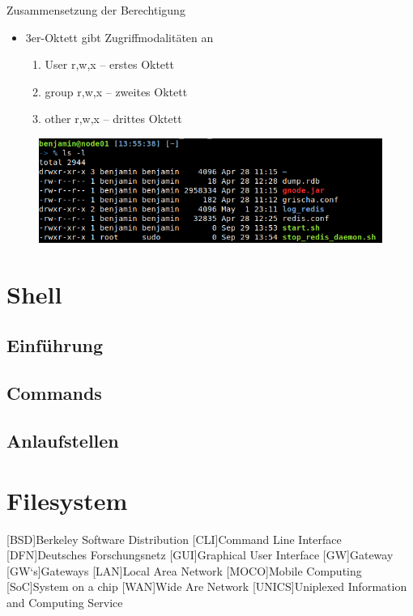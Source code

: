 \documentclass[xcolor=dvipsnames,aspectratio=169]{beamer}
\begin{document}
\begin{frame}
Zusammensetzung der Berechtigung
\begin{itemize}
	\item 3er-Oktett gibt Zugriffmodalitäten an
	\begin{enumerate}
		\item User r,w,x -- erstes Oktett
		\item group r,w,x -- zweites Oktett
		\item other r,w,x -- drittes Oktett
	\end{enumerate}
\end{itemize}
\begin{figure}
	\includegraphics[scale=0.5]{rights}
\end{figure}
\end{frame}

\section{Shell}

\subsection{Einführung}

\subsection{Commands}

\subsection{Anlaufstellen}

\section{Filesystem}

\begin{acronym}
[BSD]{Berkeley Software Distribution}
[CLI]{Command Line Interface}
[DFN]{Deutsches Forschungsnetz}
[GUI]{Graphical User Interface}
[GW]{Gateway}
[GW`s]{Gateways}
[LAN]{Local Area Network}
[MOCO]{Mobile Computing}
[SoC]{System on a chip}
[WAN]{Wide Are Network}
[UNICS]{Uniplexed Information and Computing Service}
\end{acronym}
\end{document}

